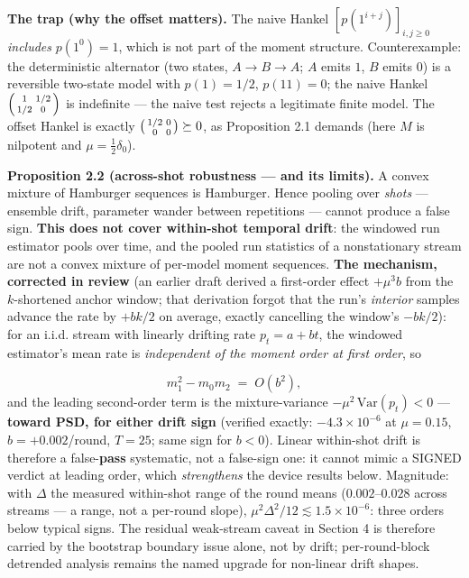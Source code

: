 \documentclass[11pt]{article}
\begin{document}
\textbf{The trap (why the offset matters).}  The naive Hankel $[p(1^{i+j})]_{i,j\ge 0}$ \emph{includes} $p(1^0) = 1$, which is not part of the moment structure.  Counterexample: the deterministic alternator (two states, $A \to B \to A$; $A$ emits $1$, $B$ emits $0$) is a reversible two-state model with $p(1) = 1/2$, $p(11) = 0$; the naive Hankel $\begin{psmallmatrix}1 & 1/2\\ 1/2 & 0\end{psmallmatrix}$ is indefinite — the naive test rejects a legitimate finite model.  The offset Hankel is exactly $\begin{psmallmatrix}1/2 & 0\\ 0 & 0\end{psmallmatrix} \succeq 0$, as Proposition 2.1 demands (here $M$ is nilpotent and $\mu = \tfrac12\delta_0$).

\textbf{Proposition 2.2 (across-shot robustness — and its limits).}  A convex mixture of Hamburger sequences is Hamburger.  Hence pooling over \emph{shots} — ensemble drift, parameter wander between repetitions — cannot produce a false sign.  \textbf{This does not cover within-shot temporal drift}: the windowed run estimator pools over time, and the pooled run statistics of a nonstationary stream are not a convex mixture of per-model moment sequences.  \textbf{The mechanism, corrected in review} (an earlier draft derived a first-order effect $+\mu^3 b$ from the $k$-shortened anchor window; that derivation forgot that the run's \emph{interior} samples advance the rate by $+bk/2$ on average, exactly cancelling the window's $-bk/2$): for an i.i.d. stream with linearly drifting rate $p_t = a + bt$, the windowed estimator's mean rate is \emph{independent of the moment order at first order}, so

\[
m_1^2 - m_0 m_2 \;=\; O(b^2),
\]
and the leading second-order term is the mixture-variance $-\mu^2\,\mathrm{Var}(p_t) < 0$ — \textbf{toward PSD, for either drift sign} (verified exactly: $-4.3\times 10^{-6}$ at $\mu = 0.15$, $b = +0.002$/round, $T = 25$; same sign for $b < 0$).  Linear within-shot drift is therefore a false-\textbf{pass} systematic, not a false-sign one: it cannot mimic a SIGNED verdict at leading order, which \emph{strengthens} the device results below.  Magnitude: with $\Delta$ the measured within-shot range of the round means ($0.002$–$0.028$ across streams — a range, not a per-round slope), $\mu^2\Delta^2/12 \lesssim 1.5\times 10^{-6}$: three orders below typical signs.  The residual weak-stream caveat in Section 4 is therefore carried by the bootstrap boundary issue alone, not by drift; per-round-block detrended analysis remains the named upgrade for non-linear drift shapes.
\end{document}
